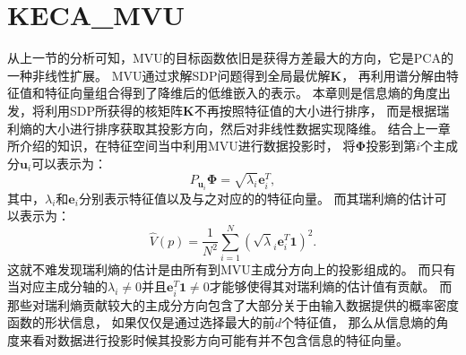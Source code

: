 \section{KECA\_MVU}

从上一节的分析可知，MVU的目标函数依旧是获得方差最大的方向，它是PCA的一种非线性扩展。
MVU通过求解SDP问题得到全局最优解$\mathbf{K}$，
再利用谱分解由特征值和特征向量组合得到了降维后的低维嵌入的表示。
本章则是信息熵的角度出发，将利用SDP所获得的核矩阵$\mathbf{K}$不再按照特征值的大小进行排序，
而是根据瑞利熵的大小进行排序获取其投影方向，然后对非线性数据实现降维。
结合上一章所介绍的知识，在特征空间当中利用MVU进行数据投影时，
将$\bm{\Phi}$投影到第$i$个主成分$\mathbf{u}_i$可以表示为：
\begin{equation}
P_{\mathbf{u}_i}\bm{\Phi}=\sqrt{\lambda_i}\mathbf{e}_i^T ,
\end{equation}
其中，$\lambda_i$和$\mathbf{e}_i$分别表示特征值以及与之对应的的特征向量。
而其瑞利熵的估计可以表示为：
\begin{equation}
\label{entropy_estimate}
\hat{V}(p)=\frac{1}{N^2}\sum \limits_{i=1}^{N}(\sqrt\lambda_i \mathbf{e}_i^T\textbf{1})^2.
\end{equation}%
这就不难发现瑞利熵的估计是由所有到MVU主成分方向上的投影组成的。
而只有当对应主成分轴的$\lambda_i\neq 0$并且$\mathbf{e}_i^T\mathbf{1}\neq 0$才能够使得其对瑞利熵的估计值有贡献。
而那些对瑞利熵贡献较大的主成分方向包含了大部分关于由输入数据提供的概率密度函数的形状信息，
如果仅仅是通过选择最大的前$d$个特征值，
那么从信息熵的角度来看对数据进行投影时候其投影方向可能有并不包含信息的特征向量。

